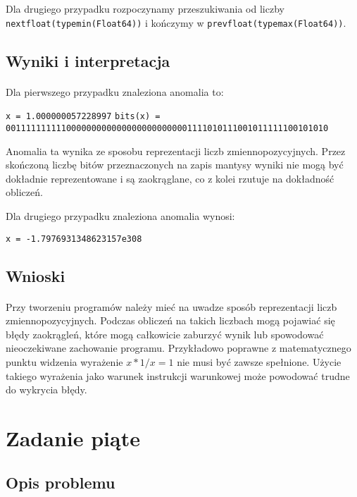 \documentclass[a4paper]{article}
\begin{document}
Dla drugiego przypadku rozpoczynamy przeszukiwania od liczby \texttt{nextfloat(typemin(Float64))} i kończymy w \texttt{prevfloat(typemax(Float64))}.
\subsection{Wyniki i interpretacja}
\paragraph{}
Dla pierwszego przypadku znaleziona anomalia to:
\begin{flushleft}
\texttt{x = 1.000000057228997}\newline
\texttt{bits(x) = 0011111111110000000000000000000000001111010111001011111100101010}
\end{flushleft}

Anomalia ta wynika ze sposobu reprezentacji liczb zmiennopozycyjnych. Przez skończoną liczbę bitów przeznaczonych na zapis mantysy wyniki nie mogą być dokładnie reprezentowane i są zaokrąglane, co z kolei rzutuje na dokładność obliczeń.

Dla drugiego przypadku znaleziona anomalia wynosi:
\begin{flushleft}
\texttt{x = -1.7976931348623157e308}
\end{flushleft} 
\subsection{Wnioski}
\paragraph{}
Przy tworzeniu programów należy mieć na uwadze sposób reprezentacji liczb zmiennopozycyjnych. Podczas obliczeń na takich liczbach mogą pojawiać się błędy zaokrągleń, które mogą całkowicie zaburzyć wynik lub spowodować nieoczekiwane zachowanie programu. Przykładowo poprawne z matematycznego punktu widzenia wyrażenie $x * 1/x = 1$ nie musi być zawsze spełnione. Użycie takiego wyrażenia jako warunek instrukcji warunkowej może powodować trudne do wykrycia błędy.

\section{Zadanie piąte}

\subsection{Opis problemu}
\end{document}
